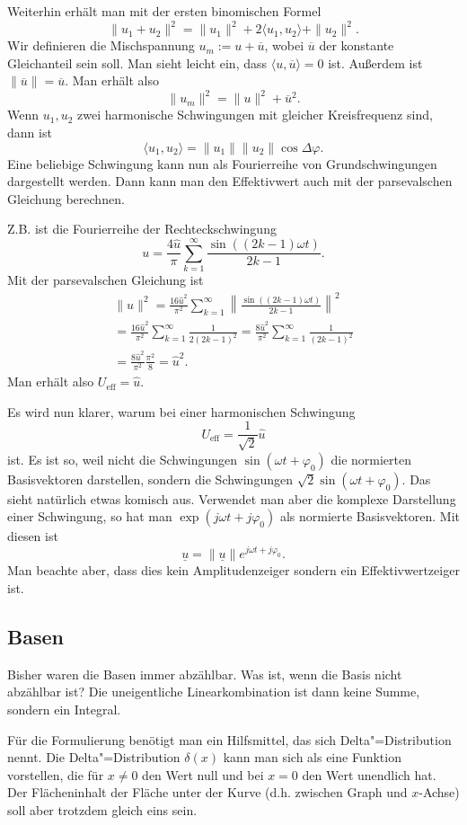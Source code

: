 \documentclass[a4paper,10pt,fleqn,twocolumn,twoside]{article}
\begin{document}
Weiterhin erhält man mit der ersten binomischen Formel
\[\|u_1+u_2\|^2 = \|u_1\|^2+2\langle u_1,u_2\rangle+\|u_2\|^2.\]
Wir definieren die Mischspannung $u_m := u+\overline u$,
wobei $\overline u$ der konstante Gleichanteil sein soll. Man sieht
leicht ein, dass $\langle u,\overline u\rangle=0$ ist.
Außerdem ist $\|\overline u\|=\overline u$. Man erhält also
\[\|u_m\|^2 = \|u\|^2+\overline u^2.\]
Wenn $u_1,u_2$ zwei harmonische Schwingungen mit gleicher
Kreisfrequenz sind, dann ist
\[\langle u_1,u_2\rangle = \|u_1\|\|u_2\|\cos\Delta\varphi.\]
Eine beliebige Schwingung kann nun als Fourierreihe von
Grundschwingungen dargestellt werden. Dann kann man den Effektivwert
auch mit der parsevalschen Gleichung berechnen.

Z.B. ist die Fourierreihe der Rechteckschwingung
\[u = \frac{4\hat u}{\pi} \sum_{k=1}^{\infty}
\frac{\sin((2k-1)\omega t)}{2k-1}.\]
Mit der parsevalschen Gleichung ist
\begin{gather*}
\|u\|^2 = \frac{16\hat u^2}{\pi^2} \sum_{k=1}^{\infty}
\left\|\frac{\sin((2k-1)\omega t)}{2k-1}\right\|^2\\
= \frac{16\hat u^2}{\pi^2} \sum_{k=1}^{\infty} \frac{1}{2(2k-1)^2}
= \frac{8\hat u^2}{\pi^2} \sum_{k=1}^{\infty} \frac{1}{(2k-1)^2}\\
= \frac{8\hat u^2}{\pi^2} \frac{\pi^2}{8} = \hat u^2.
\end{gather*}
Man erhält also $U_\mathrm{eff}=\hat u$.

Es wird nun klarer, warum bei einer harmonischen Schwingung
\[U_\mathrm{eff}=\frac{1}{\sqrt{2}}\hat u\]
ist. Es ist so, weil nicht die Schwingungen
$\sin(\omega t+\varphi_0)$ die normierten Basisvektoren darstellen,
sondern die Schwingungen $\sqrt{2}\sin(\omega t+\varphi_0)$. Das
sieht natürlich etwas komisch aus. Verwendet man aber die komplexe
Darstellung einer Schwingung, so hat man
$\exp(j\omega t+j\varphi_0)$ als normierte Basisvektoren.
Mit diesen ist
\[\underline u = \|\underline u\|e^{j\omega t+j\varphi_0}.\]
Man beachte aber, dass dies kein Amplitudenzeiger sondern ein
Effektivwertzeiger ist.

\subsection{Basen}

Bisher waren die Basen immer abzählbar. Was ist, wenn die Basis nicht
abzählbar ist? Die uneigentliche Linearkombination ist dann keine
Summe, sondern ein Integral.

Für die Formulierung benötigt man ein Hilfsmittel, das sich
Delta"=Distribution nennt. Die Delta"=Distribution $\delta(x)$ kann man
sich als eine Funktion vorstellen, die für $x\ne 0$ den Wert null
und bei $x=0$ den Wert unendlich hat. Der Flächeninhalt der Fläche
unter der Kurve (d.h. zwischen Graph und $x$-Achse) soll aber
trotzdem gleich eins sein.
\end{document}
